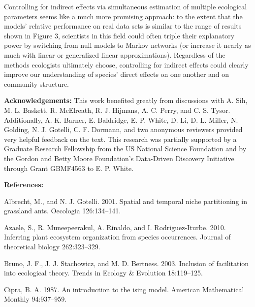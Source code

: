 \documentclass[12pt,]{article}
\begin{document}
\begin{spacing}{1.9}
\begin{flushleft}
Controlling for indirect effects via simultaneous estimation of multiple
ecological parameters seems like a much more promising approach: to the
extent that the models' relative performance on real data sets is
similar to the range of results shown in Figure 3, scientists in this
field could often triple their explanatory power by switching from null
models to Markov networks (or increase it nearly as much with linear or
generalized linear approximations). Regardless of the methods ecologists
ultimately choose, controlling for indirect effects could clearly
improve our understanding of species' direct effects on one another and
on community structure.

\noindent \textbf{Acknowledgements:} This work benefited greatly from
discussions with A. Sih, M. L. Baskett, R. McElreath, R. J. Hijmans, A.
C. Perry, and C. S. Tysor. Additionally, A. K. Barner, E. Baldridge, E.
P. White, D. Li, D. L. Miller, N. Golding, N. J. Gotelli, C. F. Dormann,
and two anonymous reviewers provided very helpful feedback on the text.
This research was partially supported by a Graduate Research Fellowship
from the US National Science Foundation and by the Gordon and Betty
Moore Foundation's Data-Driven Discovery Initiative through Grant
GBMF4563 to E. P. White.

\setlength{\parindent}{0cm}

\noindent \textbf{References:}

\setlength{\parindent}{-1em} \setlength{\leftskip}{1em}
\setlength{\parskip}{0pt}

Albrecht, M., and N. J. Gotelli. 2001. Spatial and temporal niche
partitioning in grassland ants. Oecologia 126:134--141.

Azaele, S., R. Muneepeerakul, A. Rinaldo, and I. Rodriguez-Iturbe. 2010.
Inferring plant ecosystem organization from species occurrences. Journal
of theoretical biology 262:323--329.

Bruno, J. F., J. J. Stachowicz, and M. D. Bertness. 2003. Inclusion of
facilitation into ecological theory. Trends in Ecology \& Evolution
18:119--125.

Cipra, B. A. 1987. An introduction to the ising model. American
Mathematical Monthly 94:937--959.


\end{flushleft}
\end{spacing}
\end{document}
